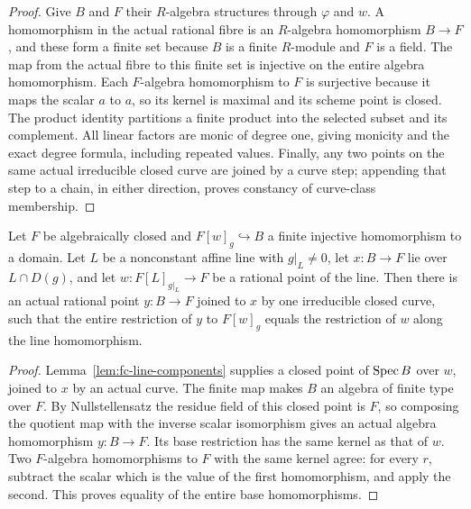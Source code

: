\begin{proof}
Give $B$ and $F$ their $R$-algebra structures through $\varphi$ and $w$. A homomorphism in the actual rational fibre
is an $R$-algebra homomorphism $B\to F$, and these form a finite set because $B$ is a finite $R$-module and $F$ is a field.
The map from the actual fibre to this finite set is injective on the entire algebra homomorphism.
Each $F$-algebra homomorphism to $F$
is surjective because it maps the scalar $a$ to $a$, so its kernel is maximal and its scheme point is closed.
The product identity partitions a finite product into the selected subset and its complement. All linear factors
are monic of degree one, giving monicity and the exact degree formula, including repeated values.
Finally, any two points on the same actual irreducible closed curve are joined by a curve step; appending that
step to a chain, in either direction, proves constancy of curve-class membership.
\end{proof}

\begin{lemma}\label{lem:fc-rational-line-components}
\leanok
{}
Let $F$ be algebraically closed and $F[w]_g\hookrightarrow B$ a finite injective homomorphism to a domain.
Let $L$ be a nonconstant affine line with $g|_L\ne0$, let $x\colon B\to F$ lie over $L\cap D(g)$, and let
$w\colon F[L]_{g|_L}\to F$ be a rational point of the line. Then there is an actual rational point
$y\colon B\to F$ joined to $x$ by one irreducible closed curve, such that the entire restriction of $y$ to
$F[w]_g$ equals the restriction of $w$ along the line homomorphism.
\end{lemma}

\begin{proof}
Lemma~\ref{lem:fc-line-components} supplies a closed point of $\operatorname{Spec} B$ over $w$, joined to $x$ by an actual curve.
The finite map makes $B$ an algebra of finite type over $F$. By Nullstellensatz the residue field of this closed
point is $F$, so composing the quotient map with the inverse scalar isomorphism gives an actual algebra
homomorphism $y\colon B\to F$. Its base restriction has the same kernel as that of $w$.
Two $F$-algebra homomorphisms to $F$ with the same kernel agree: for every $r$, subtract the scalar which is the
value of the first homomorphism, and apply the second. This proves equality of the entire base homomorphisms.
\end{proof}

